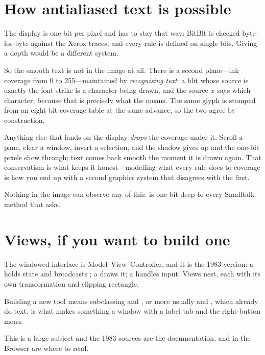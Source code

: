 \section{How antialiased text is possible}

The display is one bit per pixel and has to stay that way: BitBlt is checked
byte-for-byte against the Xerox traces, and every rule is defined on single
bits. Giving  a depth would be a different system.

So the smooth text is not in the image at all. There is a second plane---ink
coverage from 0 to 255---maintained by \emph{recognising text}: a blit whose
source is exactly the font strike is a character being drawn, and the source
$x$ says which character, because that is precisely what the 
means. The same glyph is stamped from an eight-bit coverage table at the same
advance, so the two agree by construction.

Anything else that lands on the display \emph{drops} the coverage under it.
Scroll a pane, clear a window, invert a selection, and the shadow gives up and
the one-bit pixels show through; text comes back smooth the moment it is drawn
again. That conservatism is what keeps it honest---modelling what every rule
does to coverage is how you end up with a second graphics system that
disagrees with the first.

Nothing in the image can observe any of this.  is one bit deep to
every Smalltalk method that asks.

\section{Views, if you want to build one}

The windowed interface is Model--View--Controller, and it is the 1983 version:
a  holds state and broadcasts ; a  draws it; a
 handles input. Views nest, each with its own transformation
and clipping rectangle.

Building a new tool means subclassing  and , or more
usually  and , which already
do text.  is what makes something a window with a label
tab and the right-button menu.

This is a large subject and the 1983 sources are the documentation.
 and  in the Browser are where
to read.
